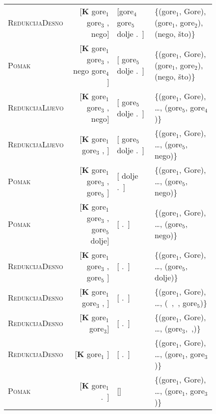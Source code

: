 \begin{figure}
\begin{tabular}{l|rlm{4cm}}
  \textsc{RedukcijaDesno}   & {[}\textbf{K} gore$_1$ gore$_3$ , nego{]}           & {[}gore$_4$ gore$_5$ dolje .~{]}                                            & \{(gore$_1$, Gore), (gore$_1$, gore$_2$), (nego, što)\}  \\
  \textsc{Pomak}            & {[}\textbf{K} gore$_1$ gore$_3$ , nego gore$_4${]}  & {[} gore$_5$ dolje .~{]}                                                    & \{(gore$_1$, Gore), (gore$_1$, gore$_2$), (nego, što)\}  \\
  \textsc{RedukcijaLijevo}  & {[}\textbf{K} gore$_1$ gore$_3$ , nego{]}           & {[} gore$_5$ dolje .~{]}                                                    & \{(gore$_1$, Gore), \ldots, (gore$_5$, gore$_4$)\}  \\
  \textsc{RedukcijaLijevo}  & {[}\textbf{K} gore$_1$ gore$_3$ , {]}               & {[} gore$_5$ dolje .~{]}                                                    & \{(gore$_1$, Gore), \ldots, (gore$_5$, nego)\}  \\
  \textsc{Pomak}            & {[}\textbf{K} gore$_1$ gore$_3$ , gore$_5$ {]}      & {[} dolje .~{]}                                                             & \{(gore$_1$, Gore), \ldots, (gore$_5$, nego)\}  \\
  \textsc{Pomak}            & {[}\textbf{K} gore$_1$ gore$_3$ , gore$_5$ dolje{]} & {[} .~{]}                                                                   & \{(gore$_1$, Gore), \ldots, (gore$_5$, nego)\}  \\
  \textsc{RedukcijaDesno}   & {[}\textbf{K} gore$_1$ gore$_3$ , gore$_5$ {]}      & {[} .~{]}                                                                   & \{(gore$_1$, Gore), \ldots, (gore$_5$, dolje)\}  \\
  \textsc{RedukcijaDesno}   & {[}\textbf{K} gore$_1$ gore$_3$ , {]}               & {[} .~{]}                                                                   & \{(gore$_1$, Gore), \ldots, (~,~, gore$_5$)\}  \\
  \textsc{RedukcijaDesno}   & {[}\textbf{K} gore$_1$ gore$_3${]}                  & {[} .~{]}                                                                   & \{(gore$_1$, Gore), \ldots, (gore$_3$,~,)\}  \\
  \textsc{RedukcijaDesno}   & {[}\textbf{K} gore$_1$ {]}                          & {[} .~{]}                                                                   & \{(gore$_1$, Gore), \ldots, (gore$_1$, gore$_3$)\}  \\
  \textsc{Pomak}            & {[}\textbf{K} gore$_1$ .~{]}                        & {[}{]}                                                                      & \{(gore$_1$, Gore), \ldots, (gore$_1$, gore$_3$)\}  \\

\end{tabular}
\end{figure}
